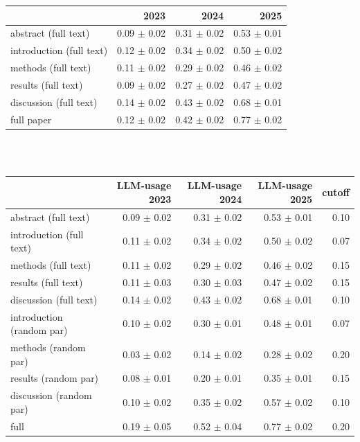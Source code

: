\begin{tabular}{lrrr}
\toprule
 & 2023 & 2024 & 2025 \\
\midrule
\rowcolor{abstract} abstract (full text)        & 0.09 $\pm$ 0.02 & 0.31 $\pm$ 0.02 & 0.53 $\pm$ 0.01 \\
\midrule
\rowcolor{introduction}introduction (full text)    & 0.12 $\pm$ 0.02 & 0.34 $\pm$ 0.02 & 0.50 $\pm$ 0.02 \\
\rowcolor{methods}methods (full text)         & 0.11 $\pm$ 0.02 & 0.29 $\pm$ 0.02 & 0.46 $\pm$ 0.02 \\
\rowcolor{results}results (full text)         & 0.09 $\pm$ 0.02 & 0.27 $\pm$ 0.02 & 0.47 $\pm$ 0.02 \\
\rowcolor{discussion}discussion (full text)      & 0.14 $\pm$ 0.02 & 0.43 $\pm$ 0.02 & 0.68 $\pm$ 0.01 \\
\midrule
\rowcolor{full}full paper                  & 0.12 $\pm$ 0.02 & 0.42 $\pm$ 0.02 & 0.77 $\pm$ 0.02 \\
\bottomrule
\end{tabular}
\\
\\
\begin{tabular}{lrrrr}
\toprule
 & LLM-usage 2023 & LLM-usage 2024 & LLM-usage 2025 & cutoff \\
\midrule
abstract (full text)        & 0.09 $\pm$ 0.02 & 0.31 $\pm$ 0.02 & 0.53 $\pm$ 0.01 & 0.10 \\
\midrule
introduction (full text)    & 0.11 $\pm$ 0.02 & 0.34 $\pm$ 0.02 & 0.50 $\pm$ 0.02 & 0.07 \\
methods (full text)         & 0.11 $\pm$ 0.02 & 0.29 $\pm$ 0.02 & 0.46 $\pm$ 0.02 & 0.15 \\
results (full text)         & 0.11 $\pm$ 0.03 & 0.30 $\pm$ 0.03 & 0.47 $\pm$ 0.02 & 0.15 \\
discussion (full text)      & 0.14 $\pm$ 0.02 & 0.43 $\pm$ 0.02 & 0.68 $\pm$ 0.01 & 0.10 \\
\midrule
introduction (random par)   & 0.10 $\pm$ 0.02 & 0.30 $\pm$ 0.01 & 0.48 $\pm$ 0.01 & 0.07 \\
methods (random par)        & 0.03 $\pm$ 0.02 & 0.14 $\pm$ 0.02 & 0.28 $\pm$ 0.02 & 0.20 \\
results (random par)        & 0.08 $\pm$ 0.01 & 0.20 $\pm$ 0.01 & 0.35 $\pm$ 0.01 & 0.15 \\
discussion (random par)     & 0.10 $\pm$ 0.02 & 0.35 $\pm$ 0.02 & 0.57 $\pm$ 0.02 & 0.10 \\
\midrule
full                        & 0.19 $\pm$ 0.05 & 0.52 $\pm$ 0.04 & 0.77 $\pm$ 0.02 & 0.20 \\
\bottomrule
\end{tabular}


